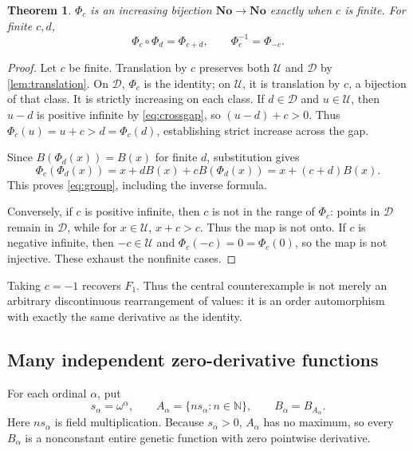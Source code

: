 \documentclass[11pt,letterpaper]{article}
\numberwithin{equation}{section}
\newtheorem{theorem}{Theorem}[section]
\theoremstyle{definition}
\theoremstyle{remark}
\newcommand{\No}{\mathbf{No}}
\newcommand{\N}{\mathbb{N}}
\newcommand{\U}{\mathcal{U}}
\newcommand{\D}{\mathcal{D}}
\begin{document}
\begin{theorem}\label{thm:auto}
$\Phi_c$ is an increasing bijection $\No\to\No$ exactly when $c$ is finite.
For finite $c,d$,
\begin{equation}\label{eq:group}
 \Phi_c\circ\Phi_d=\Phi_{c+d},\qquad
 \Phi_c^{-1}=\Phi_{-c}.
\end{equation}
\end{theorem}
\begin{proof}
Let $c$ be finite. Translation by $c$ preserves both $\U$ and $\D$ by
\cref{lem:translation}. On $\D$, $\Phi_c$ is the identity; on $\U$, it is
translation by $c$, a bijection of that class. It is strictly increasing
on each class. If $d\in\D$ and $u\in\U$, then $u-d$ is positive infinite
by \eqref{eq:crossgap}, so $(u-d)+c>0$. Thus
$\Phi_c(u)=u+c>d=\Phi_c(d)$, establishing strict increase across the gap.

Since $B(\Phi_d(x))=B(x)$ for finite $d$, substitution gives
\[
 \Phi_c(\Phi_d(x))=x+dB(x)+cB(\Phi_d(x))
 =x+(c+d)B(x).
\]
This proves \eqref{eq:group}, including the inverse formula.

Conversely, if $c$ is positive infinite, then $c$ is not in the range of
$\Phi_c$: points in $\D$ remain in $\D$, while for $x\in\U$,
$x+c>c$. Thus the map is not onto. If $c$ is negative infinite, then
$-c\in\U$ and $\Phi_c(-c)=0=\Phi_c(0)$, so the map is not injective.
These exhaust the nonfinite cases.
\end{proof}

Taking $c=-1$ recovers $F_1$. Thus the central counterexample is not merely
an arbitrary discontinuous rearrangement of values: it is an order
automorphism with exactly the same derivative as the identity.

\subsection{Many independent zero-derivative functions}
For each ordinal $\alpha$, put
\[
 s_\alpha=\omega^\alpha,\qquad
 A_\alpha=\{ns_\alpha:n\in\N\},\qquad B_\alpha=B_{A_\alpha}.
\]
Here $ns_\alpha$ is field multiplication. Because $s_\alpha>0$,
$A_\alpha$ has no maximum, so every $B_\alpha$ is a nonconstant entire
genetic function with zero pointwise derivative.
\end{document}
